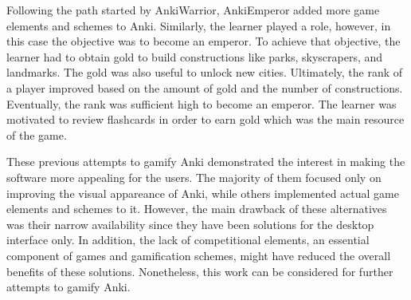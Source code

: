 Following the path started by AnkiWarrior, AnkiEmperor \citep{proxx2012emperor} added more game elements and schemes to Anki. Similarly, the learner played a role, however, in this case the objective was to become an emperor. To achieve that objective, the learner had to obtain gold to build constructions like parks, skyscrapers, and landmarks. The gold was also useful to unlock new cities. Ultimately, the rank of a player improved based on the amount of gold and the number of constructions. Eventually, the rank was sufficient high to become an emperor. The learner was motivated to review flashcards in order to earn gold which was the main resource of the game.

These previous attempts to gamify Anki demonstrated the interest in making the software more appealing for the users. The majority of them focused only on improving the visual appareance of Anki, while others implemented actual game elements and schemes to it. However, the main drawback of these alternatives was their narrow availability since they have been solutions for the desktop interface only. In addition, the lack of competitional elements, an essential component of games and gamification schemes, might have reduced the overall benefits of these solutions. Nonetheless, this work can be considered for further attempts to gamify Anki.
